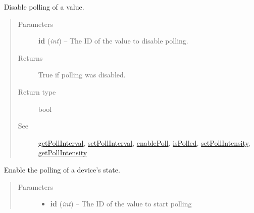 \documentclass[letterpaper,10pt,english]{sphinxmanual}
\begin{document}
\begin{fulllineitems}
\begin{fulllineitems}
\begin{quote}
\begin{description}
\end{description}\end{quote}

\end{fulllineitems}


\begin{fulllineitems}
\label{libopenzwave:libopenzwave.PyManager.disablePoll}~\label{libopenzwave:disablepoll}
Disable polling of a value.
\begin{quote}\begin{description}
\item[{Parameters}] \leavevmode
\textbf{id} (\emph{int}) -- The ID of the value to disable polling.

\item[{Returns}] \leavevmode
True if polling was disabled.

\item[{Return type}] \leavevmode
bool

\item[{See}] \leavevmode
{\hyperref[libopenzwave:getpollinterval]{getPollInterval}}, {\hyperref[libopenzwave:setpollinterval]{setPollInterval}}, {\hyperref[libopenzwave:enablepoll]{enablePoll}}, {\hyperref[libopenzwave:ispolled]{isPolled}}, {\hyperref[libopenzwave:setpollintensity]{setPollIntensity}}, {\hyperref[libopenzwave:getpollintensity]{getPollIntensity}}

\end{description}\end{quote}

\end{fulllineitems}


\begin{fulllineitems}
\label{libopenzwave:libopenzwave.PyManager.enablePoll}~\label{libopenzwave:enablepoll}
Enable the polling of a device's state.
\begin{quote}\begin{description}
\item[{Parameters}] \leavevmode\begin{itemize}
\item {} 
\textbf{id} (\emph{int}) -- The ID of the value to start polling


\end{itemize}
\end{description}
\end{quote}
\end{fulllineitems}
\end{fulllineitems}
\end{document}
